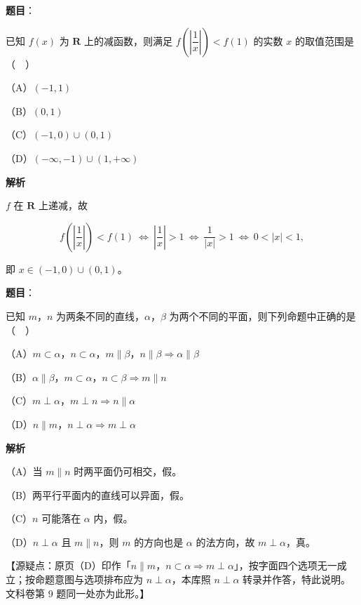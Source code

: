 \begin{answer}

\textbf{题目}：

已知 $f(x)$ 为 $\mathbf R$ 上的减函数，则满足 $f\left(\left|\dfrac1x\right|\right)<f(1)$ 的实数 $x$ 的取值范围是（　）

（A）$(-1,1)$

（B）$(0,1)$

（C）$(-1,0)\cup(0,1)$

（D）$(-\infty,-1)\cup(1,+\infty)$

\textbf{解析}

$f$ 在 $\mathbf R$ 上递减，故

\nopagebreak[4]
\[f\left(\left|\frac1x\right|\right)<f(1)\ \Longleftrightarrow\ \left|\frac1x\right|>1\ \Longleftrightarrow\ \frac1{|x|}>1\ \Longleftrightarrow\ 0<|x|<1,\]

即 $x\in(-1,0)\cup(0,1)$。


\end{answer}
\begin{answer}

\textbf{题目}：

已知 $m$，$n$ 为两条不同的直线，$\alpha$，$\beta$ 为两个不同的平面，则下列命题中正确的是（　）

（A）$m\subset\alpha$，$n\subset\alpha$，$m\parallel\beta$，$n\parallel\beta\Rightarrow\alpha\parallel\beta$

（B）$\alpha\parallel\beta$，$m\subset\alpha$，$n\subset\beta\Rightarrow m\parallel n$

（C）$m\perp\alpha$，$m\perp n\Rightarrow n\parallel\alpha$

（D）$n\parallel m$，$n\perp\alpha\Rightarrow m\perp\alpha$

\textbf{解析}

（A）当 $m\parallel n$ 时两平面仍可相交，假。

（B）两平行平面内的直线可以异面，假。

（C）$n$ 可能落在 $\alpha$ 内，假。

（D）$n\perp\alpha$ 且 $m\parallel n$，则 $m$ 的方向也是 $\alpha$ 的法方向，故 $m\perp\alpha$，真。

【源疑点：原页（D）印作「$n\parallel m$，$n\subset\alpha\Rightarrow m\perp\alpha$」，按字面四个选项无一成立；按命题意图与选项排布应为 $n\perp\alpha$，本库照 $n\perp\alpha$ 转录并作答，特此说明。文科卷第 9 题同一处亦为此形。】


\end{answer}

